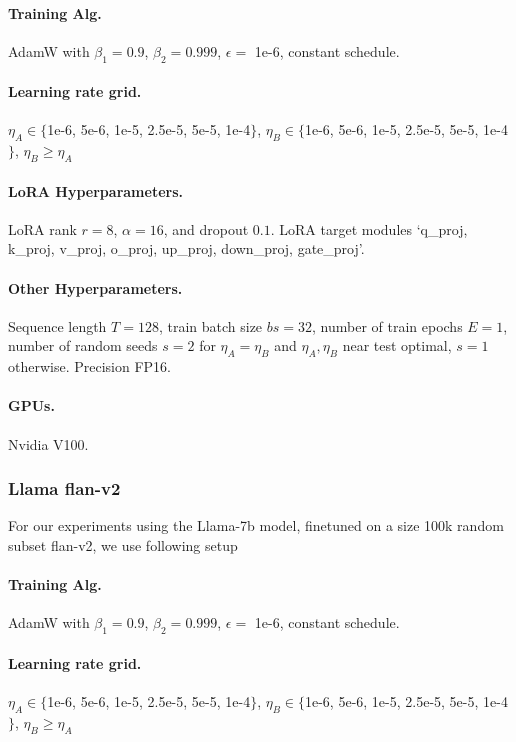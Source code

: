 \paragraph{Training Alg.} AdamW with $\beta_1 = 0.9$, $\beta_2 = 0.999$, $\epsilon =$ 1e-6, constant schedule.

\paragraph{Learning rate grid.} $\eta_A \in \{$1e-6, 5e-6, 1e-5, 2.5e-5, 5e-5, 1e-4$\}$, $\eta_B \in \{$1e-6, 5e-6, 1e-5, 2.5e-5, 5e-5, 1e-4$\}$, $\eta_B \geq \eta_A$

\paragraph{LoRA Hyperparameters.} LoRA rank $r = 8$, $\alpha = 16$, and dropout $0.1$. LoRA target modules `q\_proj, k\_proj, v\_proj, o\_proj, up\_proj, down\_proj, gate\_proj'.

\paragraph{Other Hyperparameters.} Sequence length $T = 128$, train batch size $bs = 32$, number of train epochs $E = 1$, number of random seeds $s = 2$ for $\eta_A = \eta_B$ and $\eta_A, \eta_B$ near test optimal, $s = 1$ otherwise. Precision FP16. 

\paragraph{GPUs.} Nvidia V100.

\subsubsection{Llama flan-v2}

For our experiments using the Llama-7b model, finetuned on a size 100k random subset flan-v2, we use following setup

\paragraph{Training Alg.} AdamW with $\beta_1 = 0.9$, $\beta_2 = 0.999$, $\epsilon =$ 1e-6, constant schedule.

\paragraph{Learning rate grid.} $\eta_A \in \{$1e-6, 5e-6, 1e-5, 2.5e-5, 5e-5, 1e-4$\}$, $\eta_B \in \{$1e-6, 5e-6, 1e-5, 2.5e-5, 5e-5, 1e-4$\}$, $\eta_B \geq \eta_A$


